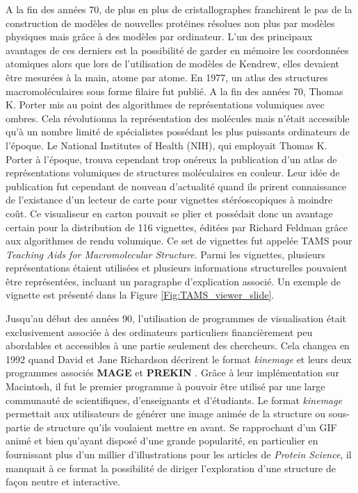 A la fin des années 70, de plus en plus de cristallographes franchirent le pas de la construction de modèles de nouvelles protéines résolues non plus par modèles physiques mais grâce à des modèles par ordinateur. L'un des principaux avantages de ces derniers est la possibilité de garder en mémoire les coordonnées atomiques alors que lors de l'utilisation de modèles de Kendrew, elles devaient être mesurées à la main, atome par atome. En 1977, un atlas des structures macromoléculaires sous forme filaire fut publié. A la fin des années 70, Thomas K. Porter mis au point des algorithmes de représentations volumiques avec ombres. Cela révolutionna la représentation des molécules mais n'était accessible qu'à un nombre limité de spécialistes possédant les plus puissants ordinateurs de l'époque.
Le National Institutes of Health (NIH), qui employait Thomas K. Porter à l'époque, trouva cependant trop onéreux la publication d'un atlas de représentations volumiques de structures moléculaires en couleur. Leur idée de publication fut cependant de nouveau d'actualité quand ils prirent connaissance de l'existance d'un lecteur de carte pour vignettes stéréoscopiques à moindre coût. Ce visualiseur en carton pouvait se plier et possédait donc un avantage certain pour la distribution de 116 vignettes, éditées par Richard Feldman grâce aux algorithmes de rendu volumique. Ce set de vignettes fut appelée TAMS pour \textit{Teaching Aids for Macromolecular Structure}. Parmi les vignettes, plusieurs représentations étaient utilisées et plusieurs informations structurelles pouvaient être représentées, incluant un paragraphe d'explication associé. Un exemple de vignette est présenté dans la Figure \ref{Fig:TAMS_viewer_slide}.


Jusqu'au début des années 90, l'utilisation de programmes de visualisation était exclusivement associée à des ordinateurs particuliers financièrement peu abordables et accessibles à une partie seulement des chercheurs. Cela changea en 1992 quand David et Jane Richardson décrirent le format \textit{kinemage} et leurs deux programmes associés \textbf{MAGE} et \textbf{PREKIN} \cite{richardson1992kinemage}. Grâce à leur implémentation sur Macintosh, il fut le premier programme à pouvoir être utilisé par une large communauté de scientifiques, d'enseignants et d'étudiants. Le format \textit{kinemage} permettait aux utilisateurs de générer une image animée de la structure ou sous-partie de structure qu'ils voulaient mettre en avant. Se rapprochant d'un GIF animé et bien qu'ayant disposé d'une grande popularité, en particulier en fournissant plus d'un millier d'illustrations pour les articles de \textit{Protein Science}, il manquait à ce format la possibilité de diriger l'exploration d'une structure de façon neutre et interactive.

